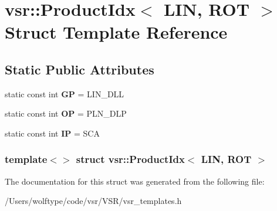 \hypertarget{structvsr_1_1_product_idx_3_01_l_i_n_00_01_r_o_t_01_4}{\section{vsr\-:\-:Product\-Idx$<$ L\-I\-N, R\-O\-T $>$ Struct Template Reference}
\label{structvsr_1_1_product_idx_3_01_l_i_n_00_01_r_o_t_01_4}
}
\subsection*{Static Public Attributes}
\begin{DoxyCompactItemize}
\item 
\hypertarget{structvsr_1_1_product_idx_3_01_l_i_n_00_01_r_o_t_01_4_a25da85e9c0e1644679caeb69f7072ecc}{static const int {\bfseries G\-P} = L\-I\-N\-\_\-\-D\-L\-L}\label{structvsr_1_1_product_idx_3_01_l_i_n_00_01_r_o_t_01_4_a25da85e9c0e1644679caeb69f7072ecc}

\item 
\hypertarget{structvsr_1_1_product_idx_3_01_l_i_n_00_01_r_o_t_01_4_af8f258829a0204653943c6dac8543676}{static const int {\bfseries O\-P} = P\-L\-N\-\_\-\-D\-L\-P}\label{structvsr_1_1_product_idx_3_01_l_i_n_00_01_r_o_t_01_4_af8f258829a0204653943c6dac8543676}

\item 
\hypertarget{structvsr_1_1_product_idx_3_01_l_i_n_00_01_r_o_t_01_4_a018177c880a2030ec78ca2fe7f2bcb5b}{static const int {\bfseries I\-P} = S\-C\-A}\label{structvsr_1_1_product_idx_3_01_l_i_n_00_01_r_o_t_01_4_a018177c880a2030ec78ca2fe7f2bcb5b}

\end{DoxyCompactItemize}
\subsubsection*{template$<$$>$ struct vsr\-::\-Product\-Idx$<$ L\-I\-N, R\-O\-T $>$}



The documentation for this struct was generated from the following file\-:\begin{DoxyCompactItemize}
\item 
/\-Users/wolftype/code/vsr/\-V\-S\-R/vsr\-\_\-templates.\-h\end{DoxyCompactItemize}
